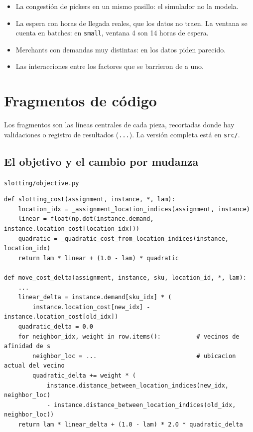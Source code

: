 \documentclass[11pt,a4paper,oneside]{report}
\newcommand{\code}[1]{\texttt{\small #1}}
\begin{document}
\begin{itemize}
  \item La congestión de pickers en un mismo pasillo: el simulador no la modela.
  \item La espera con horas de llegada reales, que los datos no traen. La ventana se cuenta en
        batches: en \code{small}, ventana 4 son 14 horas de espera.
  \item Merchants con demandas muy distintas: en los datos piden parecido.
  \item Las interacciones entre los factores que se barrieron de a uno.
\end{itemize}

\appendix

\chapter{Fragmentos de código}
\label{ap:codigo}

Los fragmentos son las líneas centrales de cada pieza, recortadas donde hay validaciones o
registro de resultados (\code{...}). La versión completa está en \code{src/}.

\section{El objetivo y el cambio por mudanza}
\code{slotting/objective.py}
\begin{lstlisting}
def slotting_cost(assignment, instance, *, lam):
    location_idx = _assignment_location_indices(assignment, instance)
    linear = float(np.dot(instance.demand, instance.location_cost[location_idx]))
    quadratic = _quadratic_cost_from_location_indices(instance, location_idx)
    return lam * linear + (1.0 - lam) * quadratic

def move_cost_delta(assignment, instance, sku, location_id, *, lam):
    ...
    linear_delta = instance.demand[sku_idx] * (
        instance.location_cost[new_idx] - instance.location_cost[old_idx])
    quadratic_delta = 0.0
    for neighbor_idx, weight in row.items():          # vecinos de afinidad de s
        neighbor_loc = ...                            # ubicacion actual del vecino
        quadratic_delta += weight * (
            instance.distance_between_location_indices(new_idx, neighbor_loc)
            - instance.distance_between_location_indices(old_idx, neighbor_loc))
    return lam * linear_delta + (1.0 - lam) * 2.0 * quadratic_delta
\end{lstlisting}
\end{document}
